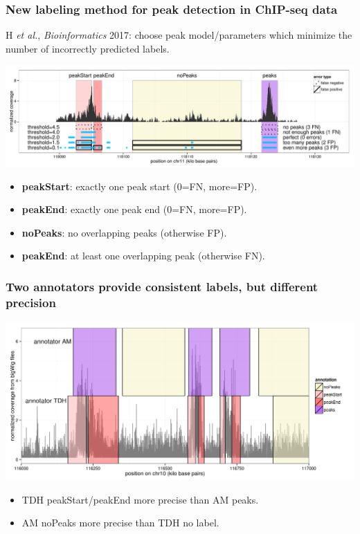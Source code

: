\documentclass{beamer}
\begin{document}
\begin{frame}
  \frametitle{New labeling method for peak detection in ChIP-seq data}

  H {\it et al.}, {\it Bioinformatics} 2017: choose peak model/parameters
  which minimize the number of incorrectly predicted labels.

  \includegraphics[width=\textwidth]{figure-PeakError.pdf}
  \begin{itemize}
  \item \textbf{peakStart}: exactly one peak start (0=FN, more=FP).
  \item \textbf{peakEnd}: exactly one peak end (0=FN, more=FP).
  \item \textbf{noPeaks}: no overlapping peaks (otherwise FP).
  \item \textbf{peakEnd}: at least one overlapping peak (otherwise FN).
  \end{itemize}
\end{frame}

\begin{frame}
  \frametitle{Two annotators provide consistent labels, but different
    precision}
  \includegraphics[width=1.1\textwidth]{screenshot-several-annotators}

  \begin{itemize}
  \item TDH peakStart/peakEnd more precise than AM peaks.
  \item AM noPeaks more precise than TDH no label.
  \end{itemize}
\end{frame}
\end{document}
